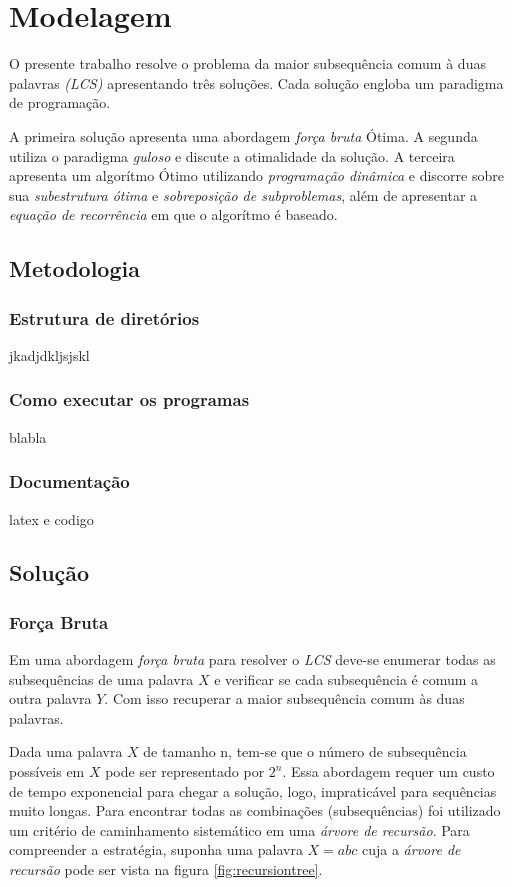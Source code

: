 \chapter{Modelagem}

O presente trabalho resolve o problema da maior subsequência comum à 
duas palavras \emph{(LCS)} apresentando três soluções. Cada solução 
engloba um paradigma de programação.

A primeira solução apresenta uma abordagem \emph{força bruta} Ótima. A 
segunda utiliza o paradigma \emph{guloso} e discute a otimalidade da 
solução. A terceira apresenta um algorítmo Ótimo utilizando 
\emph{programação dinâmica} e discorre sobre sua \emph{subestrutura 
ótima} e \emph{sobreposição de subproblemas}, além de apresentar a 
\emph{equação de recorrência} em que o algorítmo é baseado.

\section{Metodologia}

\subsection{Estrutura de diretórios}
jkadjdkljsjskl

\subsection{Como executar os programas}
blabla

\subsection{Documentação}
latex e codigo

\section{Solução}

\subsection{Força Bruta}

Em uma abordagem \emph{força bruta} para resolver o \emph{LCS} deve-se
enumerar todas as subsequências de uma palavra $X$ e verificar se cada
subsequência é comum a outra palavra $Y$. Com isso recuperar a maior 
subsequência comum às duas palavras. 

Dada uma palavra $X$ de tamanho n, tem-se que o número de
subsequência possíveis em $X$ pode ser representado por $2^n$. Essa 
abordagem requer um custo de tempo exponencial para chegar a solução, 
logo, impraticável para sequências muito longas. Para encontrar todas
as combinações (subsequências) foi utilizado um critério de caminhamento
sistemático em uma \emph{árvore de recursão}. Para compreender a 
estratégia, suponha uma palavra $X = abc$ cuja a \emph{árvore de 
recursão} pode ser vista na figura \ref{fig:recursiontree}.

